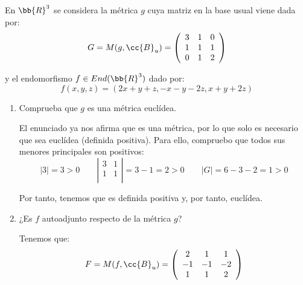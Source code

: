 \documentclass[12pt]{article}
\begin{document}
\begin{ejercicio} 
    En $\bb{R}^3$ se considera la métrica $g$ cuya matriz en la base usual viene dada por:
    \begin{equation*}
        G=M(g,\cc{B}_u)=\left(\begin{array}{ccc}
            3 & 1 & 0 \\
            1 & 1 & 1 \\
            0 & 1 & 2
        \end{array}\right)
    \end{equation*}

    y el endomorfismo $f\in End(\bb{R}^3)$ dado por:
    \begin{equation*}
        f(x,y,z)=(2x+y+z, -x-y-2z, x+y+2z)
    \end{equation*}

    \begin{enumerate}
        \item Comprueba que $g$ es una métrica euclídea.

        El enunciado ya nos afirma que es una métrica, por lo que solo es necesario que sea euclídea (definida positiva). Para ello, compruebo que todos sus menores principales son positivos:
        \begin{equation*}
            |3|=3>0
            \qquad
            \left|\begin{array}{cc}
                3 & 1 \\
                1 & 1 \\
            \end{array}\right| = 3-1 = 2>0
            \qquad
            |G|=6-3-2=1>0
        \end{equation*}

        Por tanto, tenemos que es definida positiva y, por tanto, euclídea.

        \item ¿Es $f$ autoadjunto respecto de la métrica $g$?

        Tenemos que:
        \begin{equation*}
            F=M(f,\cc{B}_u)=\left(\begin{array}{ccc}
                2 & 1 & 1 \\
                -1 & -1 & -2 \\
                1 & 1 & 2
            \end{array}\right)
        \end{equation*}
    

\end{enumerate}
\end{ejercicio}
\end{document}
